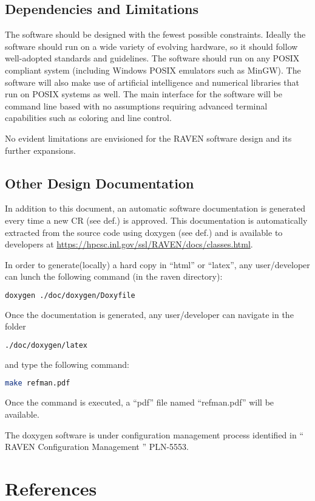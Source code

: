 \subsection{Dependencies and Limitations}
The software should be designed with the fewest possible constraints. 
Ideally the software should run on a wide variety of evolving hardware, 
so it should follow well-adopted standards and guidelines. The software
 should run on any POSIX compliant system (including Windows POSIX 
 emulators such as MinGW). The software will also make use of artificial 
 intelligence and numerical libraries that run on POSIX systems as well. 
 The main interface for the software will be command line based with no 
 assumptions requiring advanced terminal capabilities such as coloring and line control. 

No evident limitations are envisioned for the RAVEN software design and its further expansions.


\subsection{Other Design Documentation}

In addition to this document, an automatic software documentation
is generated every time a new CR (see def.) is approved. This
documentation is automatically extracted from the source code using
doxygen (see def.) and is available to developers at
\url{https://hpcsc.inl.gov/ssl/RAVEN/docs/classes.html}.

In order to generate(locally) a hard copy in ``html'' or ``latex'', any user/developer can lunch the 
following command (in the raven directory):
\begin{lstlisting}[language=bash]
doxygen ./doc/doxygen/Doxyfile
\end{lstlisting}
Once the documentation is generated, any user/developer can navigate in the folder
\begin{lstlisting}[language=bash]
./doc/doxygen/latex
\end{lstlisting}
and type the following command:
\begin{lstlisting}[language=bash]
make refman.pdf
\end{lstlisting}
Once the command is executed, a ``pdf'' file named ``refman.pdf'' will be available.

The doxygen software is under configuration management process identified in
`` RAVEN Configuration Management '' PLN-5553.


\section{References}

